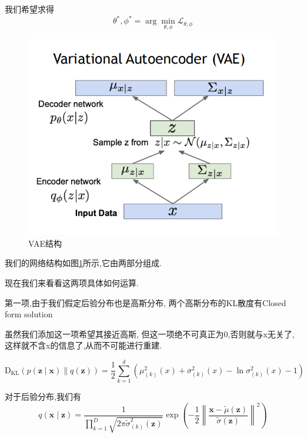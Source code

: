 	我们希望求得
	\begin{equation}
		\theta^{*}, \phi^{*} = \arg\min_{\theta, \phi} \mathcal{L}_{\theta, \phi}
	\end{equation}

	\begin{figure}[htbp]
		\centering
		\includegraphics[scale=0.5]{figures/VAE_2.png}
		\caption{VAE结构}
		\label{fig:VAE_structure}
	\end{figure}

	我们的网络结构如图\ref{fig:VAE_structure}所示,它由两部分组成.

	现在我们来看看这两项具体如何运算.
	
	第一项,由于我们假定后验分布也是高斯分布,
	两个高斯分布的KL散度有Closed form solution

	虽然我们添加这一项希望其接近高斯,
	但这一项绝不可真正为0,否则就与x无关了,这样就不含x的信息了,从而不可能进行重建.
	
	\begin{equation}
		\operatorname{D_{KL}}(p(\bm z \mid \bm x) \| q(\bm z))=\frac{1}{2} \sum_{k=1}^{d}\left(\mu_{(k)}^{2}(x)+\sigma_{(k)}^{2}(x)-\ln \sigma_{(k)}^{2}(x)-1\right)
	\end{equation}
	
	对于后验分布,我们有
	\begin{equation}
		q(\bm x \mid \bm z)=\frac{1}{\prod_{k=1}^{D} \sqrt{2 \pi \tilde{\sigma}_{(k)}^{2}(\bm z)}} \exp \left(-\frac{1}{2}\left\|\frac{\bm x-\tilde{\mu}(\bm z)}{\tilde{\sigma}(\bm z)}\right\|^{2}\right)
	\end{equation}

